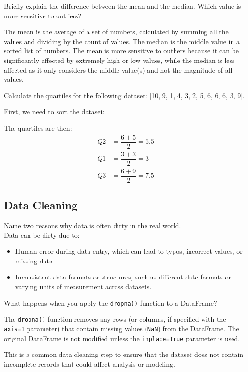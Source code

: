 \begin{ejercicio}
    Briefly explain the difference between the mean and the median. Which value is more sensitive to outliers?

    The mean is the average of a set of numbers, calculated by summing all the values and dividing by the count of values. The median is the middle value in a sorted list of numbers. The mean is more sensitive to outliers because it can be significantly affected by extremely high or low values, while the median is less affected as it only considers the middle value(s) and not the magnitude of all values.
\end{ejercicio}

\begin{ejercicio}
    Calculate the quartiles for the following dataset: [10, 9, 1, 4, 3, 2, 5, 6, 6, 6, 3, 9].

    First, we need to sort the dataset:
    \begin{equation*}
    [1, 2, 3, 3, 4, 5, 6, 6, 6, 9, 9, 10]
    \end{equation*}

    The quartiles are then:
    \begin{align*}
        Q2 &= \dfrac{6 + 5}{2} = 5.5\\
        Q1 &= \dfrac{3 + 3}{2} = 3\\
        Q3 &= \dfrac{6 + 9}{2} = 7.5
    \end{align*}
\end{ejercicio}

\subsection*{Data Cleaning}

\begin{ejercicio}
    Name two reasons why data is often dirty in the real world.\\

    Data can be dirty due to:
    \begin{itemize}
        \item Human error during data entry, which can lead to typos, incorrect values, or missing data.
        \item Inconsistent data formats or structures, such as different date formats or varying units of measurement across datasets.
    \end{itemize}
\end{ejercicio}

\begin{ejercicio}
    What happens when you apply the \verb|dropna()| function to a DataFrame?

    The \verb|dropna()| function removes any rows (or columns, if specified with the \verb|axis=1| parameter) that contain missing values (\verb|NaN|) from the DataFrame. The original DataFrame is not modified unless the \verb|inplace=True| parameter is used.
    
    This is a common data cleaning step to ensure that the dataset does not contain incomplete records that could affect analysis or modeling.
\end{ejercicio}


